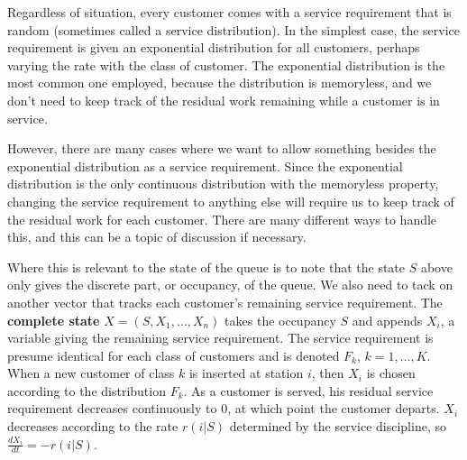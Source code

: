\documentclass[12pt,titlepage]{article}
\theoremstyle{plain}
\theoremstyle{definition}
\theoremstyle{remark}
\begin{document}
Regardless of situation, every customer comes with a service requirement that is random (sometimes called a service distribution). In the simplest case, the service requirement is given an exponential distribution for all customers, perhaps varying the rate with the class of customer. The exponential distribution is the most common one employed, because the distribution is memoryless, and we don't need to keep track of the residual work remaining while a customer is in service.

However, there are many cases where we want to allow something besides the exponential distribution as a service requirement. Since the exponential distribution is the only continuous distribution with the memoryless property, changing the service requirement to anything else will require us to keep track of the residual work for each customer. There are many different ways to handle this, and this can be a topic of discussion if necessary.

Where this is relevant to the state of the queue is to note that the state $S$ above only gives the discrete part, or occupancy, of the queue. We also need to tack on another vector that tracks each customer's remaining service requirement. The \textbf{complete state} $X = (S, X_{1},\ldots,X_{n})$ takes the occupancy $S$ and appends $X_{i}$, a variable giving the remaining service requirement. The service requirement is presume identical for each class of customers and is denoted $F_{k}$, $k=1,\ldots,K$. When a new customer of class $k$ is inserted at station $i$, then $X_{i}$ is chosen according to the distribution $F_{k}$. As a customer is served, his residual service requirement decreases continuously to 0, at which point the customer departs. $X_{i}$ decreases according to the rate $r(i|S)$ determined by the service discipline, so $\frac{d X_{i}}{dt} = -r(i|S)$.
\end{document}
